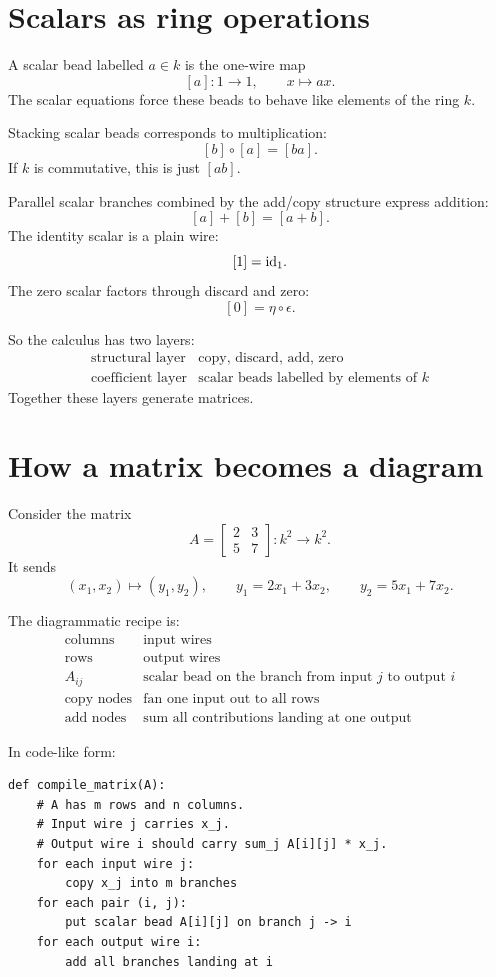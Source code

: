 \section{Scalars as ring operations}

A scalar bead labelled \(a\in k\) is the one-wire map
\[
  [a]:1\to1,\qquad x\mapsto ax.
\]
The scalar equations force these beads to behave like elements of the ring \(k\).

Stacking scalar beads corresponds to multiplication:
\[
  [b]\circ[a]=[ba].
\]
If \(k\) is commutative, this is just \([ab]\).

Parallel scalar branches combined by the add/copy structure express addition:
\[
  [a]+[b]=[a+b].
\]
The identity scalar is a plain wire:
\[
  [1]=\mathrm{id}_1.
\]
The zero scalar factors through discard and zero:
\[
  [0]=\eta\circ\epsilon.
\]

So the calculus has two layers:
\[
\begin{array}{c|c}
\text{structural layer} & \text{copy, discard, add, zero}\\
\text{coefficient layer} & \text{scalar beads labelled by elements of }k
\end{array}
\]
Together these layers generate matrices.

\section{How a matrix becomes a diagram}

Consider the matrix
\[
  A=\begin{bmatrix}
  2&3\\
  5&7
  \end{bmatrix}:k^2\to k^2.
\]
It sends
\[
  (x_1,x_2)\longmapsto(y_1,y_2),\qquad
  y_1=2x_1+3x_2,\qquad
  y_2=5x_1+7x_2.
\]

The diagrammatic recipe is:
\[
\begin{array}{ll}
\text{columns} & \text{input wires}\\
\text{rows} & \text{output wires}\\
A_{ij} & \text{scalar bead on the branch from input }j\text{ to output }i\\
\text{copy nodes} & \text{fan one input out to all rows}\\
\text{add nodes} & \text{sum all contributions landing at one output}
\end{array}
\]

In code-like form:
\begin{verbatim}
def compile_matrix(A):
    # A has m rows and n columns.
    # Input wire j carries x_j.
    # Output wire i should carry sum_j A[i][j] * x_j.
    for each input wire j:
        copy x_j into m branches
    for each pair (i, j):
        put scalar bead A[i][j] on branch j -> i
    for each output wire i:
        add all branches landing at i
\end{verbatim}

